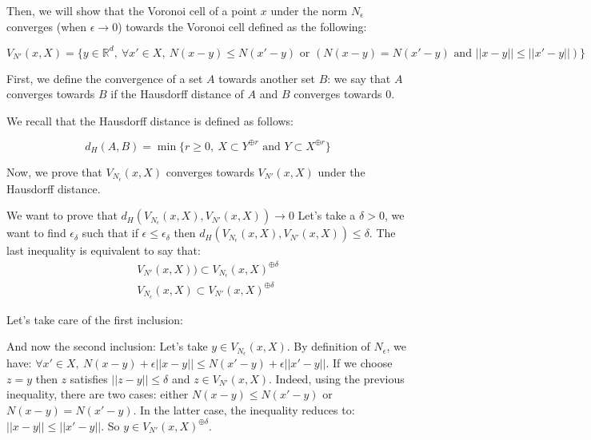 Then, we will show that the Voronoi cell of a point $ x $ under the norm $
N_\epsilon $ converges (when $ \epsilon \rightarrow 0 $) towards the Voronoi
cell defined as the following:

$$ V_{N'}(x, X) = \{ y \in \mathbb{R}^d,~\forall x' \in X,~N(x - y) \leq N(x'
-y) \text{ or } (N(x - y) = N(x' - y) \text { and } || x -y || \leq || x' - y ||) \} $$

First, we define the convergence of a set $ A $ towards another set $ B $: we
say that $ A $ converges towards $ B $ if the Hausdorff distance of $ A $ and $
B $ converges towards $ 0 $.

We recall that the Hausdorff distance is defined as follows:

$$ d_H(A, B) = \min \{ r \geq 0,~X \subset Y^{\oplus r} \text{ and } Y \subset
X^{\oplus r} \} $$

Now, we prove that $ V_{N_\epsilon}(x, X) $ converges towards $ V_{N'}(x, X) $
under the Hausdorff distance.

We want to prove that $ d_H(V_{N_\epsilon}(x, X), V_{N'}(x, X)) \rightarrow 0 $
Let's take a $ \delta > 0 $, we want to find $ \epsilon_\delta $ such that if $
\epsilon \leq \epsilon_\delta $ then $ d_H(V_{N_\epsilon}(x, X), V_{N'}(x, X))
\leq \delta $. The last inequality is equivalent to say that:
\begin{align}
    V_{N'}(x, X)) \subset V_{N_\epsilon}(x, X)^{\oplus \delta} \\
    V_{N_\epsilon}(x, X) \subset V_{N'}(x, X)^{\oplus \delta}
    \label{eqn:haussdorf-voronoi1}
\end{align}

Let's take care of the first inclusion:

And now the second inclusion:
Let's take $ y \in V_{N_\epsilon}(x, X) $. By definition of $ N_\epsilon $, we
have: $ \forall x' \in X,~N(x - y) + \epsilon || x - y || \leq N(x' - y) +
\epsilon || x' - y || $. If we choose $ z = y $ then $ z $ satisfies $ || z - y
|| \leq \delta $ and $ z \in V_{N'}(x, X) $. Indeed, using the previous
inequality, there are two cases: either $ N(x - y) \leq N(x' - y) $ or $ N(x -
y) = N(x' - y) $. In the latter case, the inequality reduces to: $ || x - y || \leq
|| x' - y || $. So $ y \in V_{N'}(x, X)^{\oplus \delta} $.

